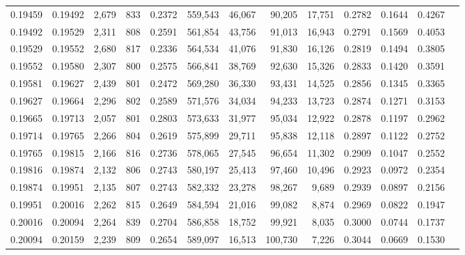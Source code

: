 \begin{tabular}{rrrrrrrrrrrrr}
0.19459 & 0.19492 &  2,679 & 833 &                                     0.2372 & 559,543 &  46,067 &  90,205 &  17,751 & 0.2782 & 0.1644 & 0.4267 \\
0.19492 & 0.19529 &  2,311 & 808 &                                     0.2591 & 561,854 &  43,756 &  91,013 &  16,943 & 0.2791 & 0.1569 & 0.4053 \\
0.19529 & 0.19552 &  2,680 & 817 &                                     0.2336 & 564,534 &  41,076 &  91,830 &  16,126 & 0.2819 & 0.1494 & 0.3805 \\
0.19552 & 0.19580 &  2,307 & 800 &                                     0.2575 & 566,841 &  38,769 &  92,630 &  15,326 & 0.2833 & 0.1420 & 0.3591 \\
0.19581 & 0.19627 &  2,439 & 801 &                                     0.2472 & 569,280 &  36,330 &  93,431 &  14,525 & 0.2856 & 0.1345 & 0.3365 \\
0.19627 & 0.19664 &  2,296 & 802 &                                     0.2589 & 571,576 &  34,034 &  94,233 &  13,723 & 0.2874 & 0.1271 & 0.3153 \\
0.19665 & 0.19713 &  2,057 & 801 &                                     0.2803 & 573,633 &  31,977 &  95,034 &  12,922 & 0.2878 & 0.1197 & 0.2962 \\
0.19714 & 0.19765 &  2,266 & 804 &                                     0.2619 & 575,899 &  29,711 &  95,838 &  12,118 & 0.2897 & 0.1122 & 0.2752 \\
0.19765 & 0.19815 &  2,166 & 816 &                                     0.2736 & 578,065 &  27,545 &  96,654 &  11,302 & 0.2909 & 0.1047 & 0.2552 \\
0.19816 & 0.19874 &  2,132 & 806 &                                     0.2743 & 580,197 &  25,413 &  97,460 &  10,496 & 0.2923 & 0.0972 & 0.2354 \\
0.19874 & 0.19951 &  2,135 & 807 &                                     0.2743 & 582,332 &  23,278 &  98,267 &   9,689 & 0.2939 & 0.0897 & 0.2156 \\
0.19951 & 0.20016 &  2,262 & 815 &                                     0.2649 & 584,594 &  21,016 &  99,082 &   8,874 & 0.2969 & 0.0822 & 0.1947 \\
0.20016 & 0.20094 &  2,264 & 839 &                                     0.2704 & 586,858 &  18,752 &  99,921 &   8,035 & 0.3000 & 0.0744 & 0.1737 \\
0.20094 & 0.20159 &  2,239 & 809 &                                     0.2654 & 589,097 &  16,513 & 100,730 &   7,226 & 0.3044 & 0.0669 & 0.1530 \\

\end{tabular}
